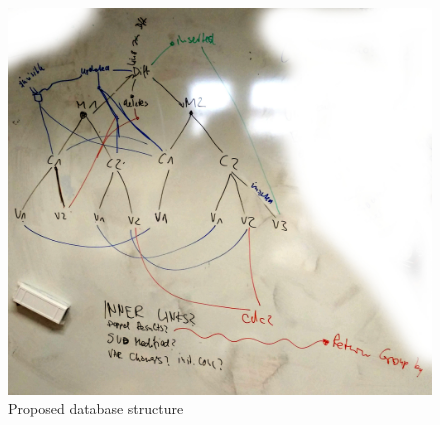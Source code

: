 \begin{figure}[h]
	\includegraphics[width=\textwidth]{resources/db_structure.jpg}
	\caption{Proposed database structure}
	\label{fig:db-model}
\end{figure}
